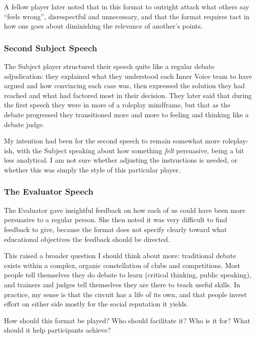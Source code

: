 \documentclass[12pt]{article}
\begin{document}
A fellow player later noted that in this format to outright attack what others say ``feels wrong'', disrespectful and unnecessary, and that the format requires tact in how one goes about diminishing the relevance of another's points.

\subsubsection{Second Subject Speech}

The Subject player structured their speech quite like a regular debate adjudication: they explained what they understood each Inner Voice team to have argued and how convincing each case was, then expressed the solution they had reached and what had factored most in their decision. They later said that during the first speech they were in more of a roleplay mindframe, but that as the debate progressed they transitioned more and more to feeling and thinking like a debate judge.

My intention had been for the second speech to remain somewhat more roleplay-ish, with the Subject speaking about how something \textit{felt} persuasive, being a bit less analytical. I am not sure whether adjusting the instructions is needed, or whether this was simply the style of this particular player.

\subsubsection{The Evaluator Speech}

The Evaluator gave insightful feedback on how each of us could have been more persuasive to a regular person. She then noted it was very difficult to find feedback to give, because the format does not specify clearly toward what educational objectives the feedback should be directed.

This raised a broader question I should think about more: traditional debate exists within a complex, organic constellation of clubs and competitions. Most people tell themselves they do debate to learn (critical thinking, public speaking), and trainers and judges tell themselves they are there to teach useful skills. In practice, my sense is that the circuit has a life of its own, and that people invest effort on either side mostly for the social reputation it yields.

How should this format be played? Who should facilitate it? Who is it for? What should it help participants achieve?
\end{document}
